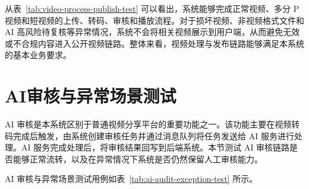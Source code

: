 从表~\ref{tab:video-process-publish-test} 可以看出，系统能够完成正常视频、多分 P 视频和短视频的上传、转码、审核和播放流程。对于损坏视频、非视频格式文件和 AI 高风险待复核等异常情况，系统不会将相关视频展示到用户端，从而避免无效或不合规内容进入公开视频链路。整体来看，视频处理与发布链路能够满足本系统的基本业务要求。

\section{AI审核与异常场景测试}
\label{sec:ai-audit-exception-test}

AI 审核是本系统区别于普通视频分享平台的重要功能之一。该功能主要在视频转码完成后触发，由系统创建审核任务并通过消息队列将任务发送给 AI 服务进行处理。AI 服务完成处理后，将审核结果回写到后端系统。本节测试 AI 审核链路是否能够正常流转，以及在异常情况下系统是否仍然保留人工审核能力。

AI 审核与异常场景测试用例如表~\ref{tab:ai-audit-exception-test} 所示。

